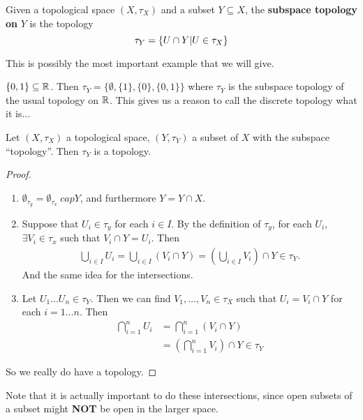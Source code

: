 \documentclass[12pt, twosided]{article}
\begin{document}
\begin{df}
  Given a topological space \((X, \tau_X)\) and a subset \(Y \subseteq X\), the \textbf{subspace topology on} \(Y\) is the topology \[\tau_Y = \left\{ U \cap Y \middle\vert U \in \tau_X \right\}\]
\end{df}
This is possibly the most important example that we will give.

\begin{exa}
  \(\{0, 1\} \subseteq \mathbb{R}\). Then \(\tau_Y = \{\emptyset, \{1\}, \{0\}, \{0, 1\}\}\) where \(\tau_Y\) is the subspace topology of the usual topology on \(\mathbb{R}\). This gives us a reason to call the discrete topology what it is...
\end{exa}

\begin{prop}
  Let \((X, \tau_X)\) a topological space, \((Y, \tau_Y)\) a subset of \(X\) with the subspace ``topology''. Then \(\tau_Y\) is a topology.
\end{prop}
\begin{proof}
  \begin{enumerate}
  \item \(\emptyset_{\tau_y} = \emptyset_{\tau_x} \ cap Y\), and furthermore \(Y = Y \cap X\).
  \item Suppose that \(U_i \in \tau_y\) for each \(i \in I\). By the definition of \(\tau_y\), for each \(U_i\), \(\exists V_i \in \tau_x\) such that \(V_i \cap Y = U_i\). Then
    \begin{align*}
      \bigcup_{i\in I} U_i = \bigcup_{i \in I} (V_i \cap Y) = \left( \bigcup_{i \in I} V_i \right) \cap Y \in \tau_Y.
    \end{align*}
    And the same idea for the intersections. 
  \item Let \(U_1 \ldots U_n \in \tau_Y\). Then we can find \(V_1, \ldots, V_n \in \tau_X\) such that \(U_i = V_i \cap Y\) for each \(i = 1 \ldots n\). Then
    \begin{align*}
      \bigcap_{i = 1}^n U_i &= \bigcap_{i =1}^n (V_i \cap Y) \\
                            &= \left(\bigcap_{i = 1}^n V_i\right) \cap Y \in \tau_Y
    \end{align*}
  \end{enumerate}
  So we really do have a topology.
\end{proof}

Note that it is actually important to do these intersections, since open subsets of a subset might \textbf{NOT} be open in the larger space.
\end{document}

